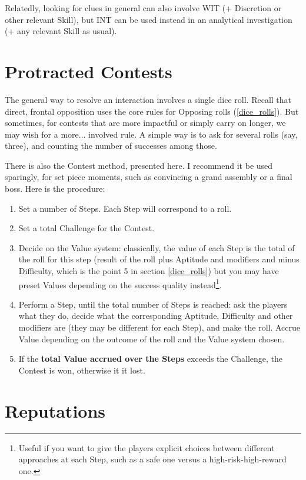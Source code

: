 Relatedly, looking for clues in general can also involve WIT (+ Discretion or other relevant Skill), but INT can be used instead in an analytical investigation (+ any relevant Skill as usual).


\section{Protracted Contests}
\label{protracted}

The general way to resolve an interaction involves a single dice roll. Recall that direct, frontal opposition uses the core rules for Opposing rolls (\ref{dice_rolls}). But sometimes, for contests that are more impactful or simply carry on longer, we may wish for a more... involved rule. A simple way is to ask for several rolls (say, three), and counting the number of successes among those.

There is also the Contest method, presented here. I recommend it be used sparingly, for set piece moments, such as convincing a grand assembly or a final boss. Here is the procedure:

\begin{enumerate}
    \item Set a number of Steps. Each Step will correspond to a roll.
    \item Set a total Challenge for the Contest.
    \item Decide on the Value system: classically, the value of each Step is the total of the roll for this step (result of the roll plus Aptitude and modifiers and minus Difficulty, which is the point 5 in section \ref{dice_rolls}) but you may have preset Values depending on the success quality instead\footnote{Useful if you want to give the players explicit choices between different approaches at each Step, such as a safe one versus a high-risk-high-reward one.}.
    \item Perform a Step, until the total number of Steps is reached: ask the players what they do, decide what the corresponding Aptitude, Difficulty and other modifiers are (they may be different for each Step), and make the roll. Accrue Value depending on the outcome of the roll and the Value system chosen.
    \item If the \textbf{total Value accrued over the Steps} exceeds the Challenge, the Contest is won, otherwise it it lost.
\end{enumerate}


\section{Reputations}

